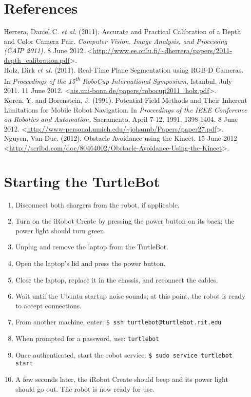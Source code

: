 \documentclass{article}
\begin{document}
\section{References}
Herrera, Daniel C. \textit{et al.} (2011). Accurate and Practical Calibration of a Depth and Color Camera Pair. \textit{Computer Vision, Image Analysis, and Processing (CAIP 2011).} 8 June 2012. <\url{http://www.ee.oulu.fi/~dherrera/papers/2011-depth_calibration.pdf}>.\\
Holz, Dirk \textit{et al.} (2011). Real-Time Plane Segmentation using RGB-D Cameras. In \textit{Proceedings of the 15\textsuperscript{th} RoboCup International Symposium,} Istanbul, July 2011. 11 June 2012. <\url{ais.uni-bonn.de/papers/robocup2011_holz.pdf}>.\\
Koren, Y. and Borenstein, J. (1991). Potential Field Methods and Their Inherent Limitations for Mobile Robot Navigation. In \textit{Proceedings of the IEEE Conference on Robotics and Automation,} Sacramento, April 7-12, 1991, 1398-1404. 8 June 2012. <\url{http://www-personal.umich.edu/~johannb/Papers/paper27.pdf}>.\\
Nguyen, Van-Duc. (2012). Obstacle Avoidance using the Kinect. 15 June 2012 <\url{http://scribd.com/doc/80464002/Obstacle-Avoidance-Using-the-Kinect}>.

\section{Starting the TurtleBot}
\label{sec:start}
\begin{enumerate}
\item{Disconnect both chargers from the robot, if applicable.}
\item{Turn on the iRobot Create by pressing the power button on its back; the power light should turn green.}
\item{Unplug and remove the laptop from the TurtleBot.}
\item{Open the laptop's lid and press the power button.}
\item{Close the laptop, replace it in the chassis, and reconnect the cables.}
\item{Wait until the Ubuntu startup noise sounds; at this point, the robot is ready to accept connections.}
\item{\label{lst:connopen}From another machine, enter: \texttt{\$\ ssh turtlebot@turtlebot.rit.edu}}
\item{\label{lst:connclose}When prompted for a password, use: \texttt{turtlebot}}
\item{Once authenticated, start the robot service: \texttt{\$\ sudo service turtlebot start}}
\item{A few seconds later, the iRobot Create should beep and its power light should go out.  The robot is now ready for use.}
\end{enumerate}
\end{document}
